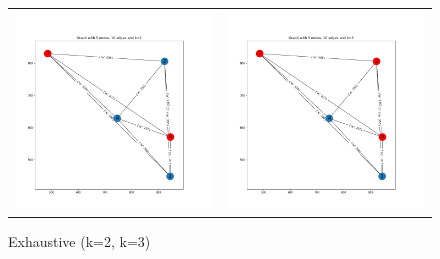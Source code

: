 \documentclass[longpaper, english, final, times]{revdetua}
\begin{document}
		\begin{figure}[!h]
			\begin{tabular}{cc}
				\includegraphics[width=0.5\linewidth]{imgs/exhaustive_n5_k2.png} &   \includegraphics[width=0.5\linewidth]{imgs/exhaustive_n5_k3.png} \\
			\end{tabular}
			\caption{Exhaustive (k=2, k=3)}
			\label{figure:exhaustivek2_k3}
		\end{figure}
		
\end{document}
